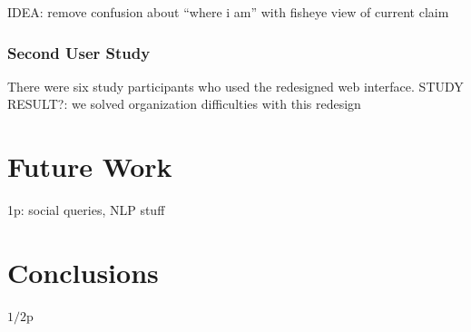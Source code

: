 \documentclass{chi2009}
\newcommand{\idea}[1]{{\color{blue} IDEA: #1}\\}
\newcommand{\studyresult}[1]{{\color{red} STUDY RESULT?: #1}\\}
\begin{document}
\idea{remove confusion about ``where i am'' with fisheye view of current claim}

\subsubsection{Second User Study}
\label{secondstudy}
There were six study participants who used the redesigned web interface.
\studyresult{we solved organization difficulties with this redesign}



\section{Future Work}
1p: social queries, NLP stuff

\section{Conclusions}
$1/2$p




\end{document}
